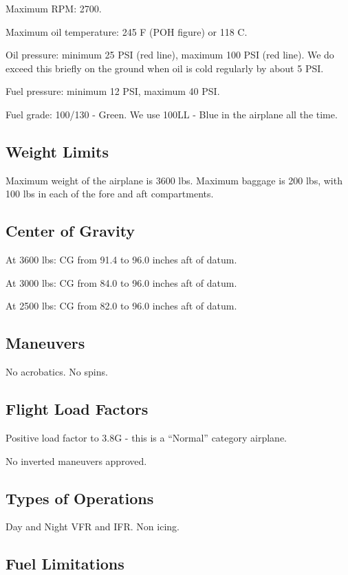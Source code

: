 Maximum RPM: 2700.

Maximum oil temperature: 245 F (POH figure) or 118 C.

Oil pressure: minimum 25 PSI (red line), maximum 100 PSI (red line). We do exceed this briefly on the ground when oil is cold regularly by about 5 PSI.

Fuel pressure: minimum 12 PSI, maximum 40 PSI.

Fuel grade: 100/130 - Green. We use 100LL - Blue in the airplane all the time.

\subsection{Weight Limits}

Maximum weight of the airplane is 3600 lbs. Maximum baggage is 200 lbs, with 100 lbs in each of the fore and aft compartments.

\subsection{Center of Gravity}

At 3600 lbs: CG from 91.4 to 96.0 inches aft of datum.

At 3000 lbs: CG from 84.0 to 96.0 inches aft of datum.

At 2500 lbs: CG from 82.0 to 96.0 inches aft of datum.

\subsection{Maneuvers}

No acrobatics. No spins.

\subsection{Flight Load Factors}

Positive load factor to 3.8G - this is a ``Normal'' category airplane.

No inverted maneuvers approved.

\subsection{Types of Operations}

Day and Night VFR and IFR. Non icing.

\subsection{Fuel Limitations}

